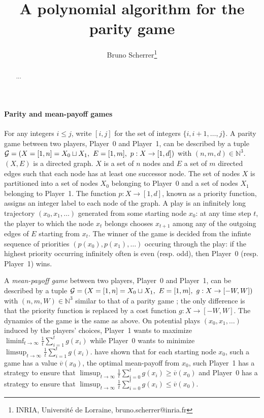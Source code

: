 \documentclass{article}
\title{A polynomial algorithm for the parity game}
\author{Bruno Scherrer\footnote{INRIA, Universit\'e de Lorraine, bruno.scherrer@inria.fr}}
\def\N{\mathbb N}
\def\G{{\cal G}}
\def\v{\overline v}
\def\pa{Player~0}
\def\pb{Player~1}
\begin{document}
\maketitle

\begin{abstract}
  ...
\end{abstract}


\paragraph{Parity and mean-payoff games}
For any integers $i \le j$, write $[i,j]$ for the set of integers $\{i,i+1,\dots,j\}$.
A parity game between two players, \pa{ }and \pb, can be described by a tuple $\G=(X=[1,n]=X_0 \sqcup X_1,~ E=[1,m],~ p:X \to [1,d])$ with $(n,m,d) \in \N^3$.
$(X,E)$ is a directed graph. $X$ is a set of $n$ nodes and $E$ a set of $m$ directed edges such that each node has at least one successor node. 
The set of nodes  $X$ is partitioned into a set of nodes $X_0$ belonging to \pa{ }and a set of nodes $X_1$ belonging to \pb. The function $p:X \to [1,d]$, known as a priority function, assigns an integer label to each node of the graph.
A play is an infinitely long trajectory $(x_0,x_1,\dots)$ generated from some starting node $x_0$: at any time step $t$, the player to which the node $x_t$ belongs chooses $x_{t+1}$ among any of the outgoing edges of $E$ starting from $x_t$. The winner of the game is decided from the infinte sequence of priorities $(p(x_0),p(x_1),\dots)$ occuring through the play: if the highest priority occurring infinitely often is even (resp. odd), then \pa{ }(resp. \pb) wins.

A \emph{mean-payoff game} between two players, \pa{ }and \pb, can be described by a tuple $\G=(X=[1,n]=X_0 \sqcup X_1,~ E=[1,m],~ g:X \to [-W,W])$ with $(n,m,W) \in \N^3$ similar to that of a parity game ; the only difference is that the priority function is replaced by a cost function $g:X \to [-W,W]$. The dynamics of the game is the same as above. On potential plays $(x_0,x_1,\dots)$ induced by the players' choices, \pb{ }wants to maximize $\liminf_{t \to \infty}\frac{1}{t} \sum_{i=1}^t g(x_i)$ while \pa{ }wants to minimize $\limsup_{t \to \infty}\frac{1}{t} \sum_{i=1}^t g(x_i)$. \citet{ehrenfeucht79} have shown that for each starting node $x_0$,  such a game has a value $\v(x_0)$, the optimal mean-payoff from $x_0$, such \pb{ }has a strategy to ensure that $\limsup_{t \to \infty}\frac{1}{t} \sum_{i=0}^t g(x_i) \ge \v(x_0)$ and \pa{ }has a strategy to ensure that $\limsup_{t \to \infty}\frac{1}{t} \sum_{i=0}^t g(x_i) \le \v(x_0)$.
\end{document}
